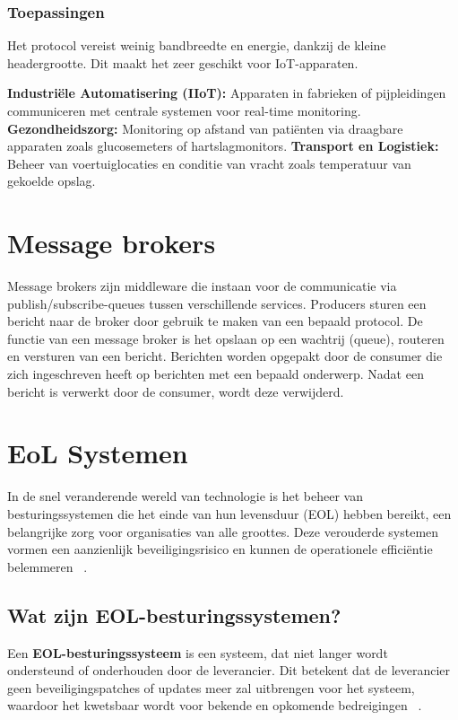\subsubsection{Toepassingen}
Het protocol vereist weinig bandbreedte en energie, dankzij de kleine headergrootte. 
Dit maakt het zeer geschikt voor IoT-apparaten.

\textbf{Industriële Automatisering (IIoT):} Apparaten in fabrieken of pijpleidingen communiceren met centrale systemen voor real-time monitoring.
\textbf{Gezondheidszorg:} Monitoring op afstand van patiënten via draagbare apparaten zoals glucosemeters of hartslagmonitors.
\textbf{Transport en Logistiek:} Beheer van voertuiglocaties en conditie van vracht zoals temperatuur van gekoelde opslag.
 
\section{Message brokers}
Message brokers zijn middleware die instaan voor de communicatie via publish/subscribe-queues tussen verschillende services.
Producers sturen een bericht naar de broker door gebruik te maken van een bepaald protocol.
De functie van een message broker is het opslaan op een wachtrij (queue), routeren en versturen van een bericht.
Berichten worden opgepakt door de consumer die zich ingeschreven heeft op berichten met een bepaald onderwerp.
Nadat een bericht is verwerkt door de consumer, wordt deze verwijderd.

\section{EoL Systemen}
In de snel veranderende wereld van technologie is het beheer van besturingssystemen die het einde van hun levensduur (EOL) 
hebben bereikt, een belangrijke zorg voor organisaties van alle groottes. 
Deze verouderde systemen vormen een aanzienlijk beveiligingsrisico en kunnen de operationele efficiëntie belemmeren ~\autocite{Mittal2024}.

\subsection{Wat zijn EOL-besturingssystemen?}
Een \textbf{EOL-besturingssysteem} is een systeem, dat niet langer wordt ondersteund of onderhouden door de leverancier. 
Dit betekent dat de leverancier geen beveiligingspatches of updates meer zal uitbrengen voor het systeem, 
waardoor het kwetsbaar wordt voor bekende en opkomende bedreigingen ~\autocite{Mittal2024}.

